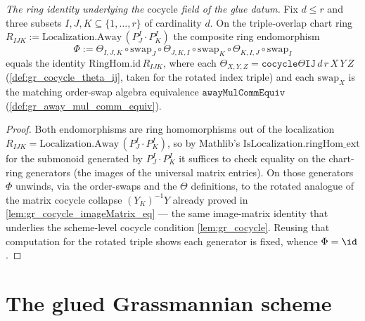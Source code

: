 \begin{lemma}\leanok
[The rotated triple-overlap ring cocycle identity \(\Phi = \id\)]
  \label{lem:gr_cocycle_phi_id}
  \textit{The ring identity underlying the \(\mathrm{cocycle}\) field of the glue datum.}
  Fix \(d \le r\) and three subsets \(I,J,K \subseteq \{1,\dots,r\}\) of cardinality \(d\). On the
  triple-overlap chart ring \(R_{IJK} := \mathrm{Localization.Away}\,(P^I_J\cdot P^I_K)\)
  the composite ring endomorphism
  \[
    \Phi := \Theta_{I,J,K} \circ \mathrm{swap}_J \circ \Theta_{J,K,I} \circ \mathrm{swap}_K
            \circ \Theta_{K,I,J} \circ \mathrm{swap}_I
  \]
  equals the identity \(\mathrm{RingHom.id}\,R_{IJK}\), where each \(\Theta_{X,Y,Z} =
  \mathtt{cocycleΘIJ}\,d\,r\,X\,Y\,Z\) (\cref{def:gr_cocycle_theta_ij}, taken for the rotated index
  triple) and each \(\mathrm{swap}_X\) is the matching order-swap algebra equivalence
  \(\mathtt{awayMulCommEquiv}\) (\cref{def:gr_away_mul_comm_equiv}).
\end{lemma}
\begin{proof}
  \leanok
  Both endomorphisms are ring homomorphisms out of the localization
  \(R_{IJK} = \mathrm{Localization.Away}\,(P^I_J\cdot P^I_K)\), so by Mathlib's
  \(\mathrm{IsLocalization.ringHom\_ext}\) for the submonoid generated by
  \(P^I_J\cdot P^I_K\) it suffices to
  check equality on the chart-ring generators (the images of the universal matrix entries). On those
  generators \(\Phi\) unwinds, via the order-swaps and the \(\Theta\) definitions, to the rotated
  analogue of the matrix cocycle collapse \((Y_K)^{-1}Y\) already proved in
  \cref{lem:gr_cocycle_imageMatrix_eq} — the same image-matrix identity that underlies the scheme-level
  cocycle condition \cref{lem:gr_cocycle}. Reusing that computation for the rotated triple shows each
  generator is fixed, whence \(\Phi = \id\).
\end{proof}

\section{The glued Grassmannian scheme}
\label{sec:gr_glued}

